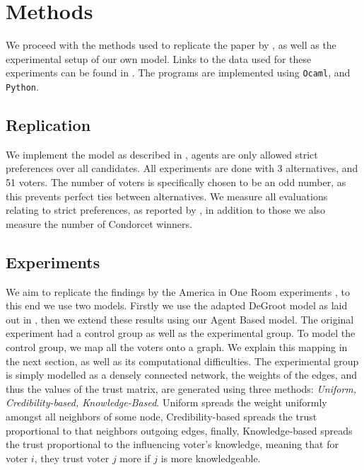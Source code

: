 \chapter{Methods}
\label{Methods}

We proceed with the methods used to replicate the paper by \citet{radDeliberationSinglePeakednessCoherent2021}, as well as the experimental setup of our own model. Links to the data used for these experiments can be found in . The programs are implemented using \texttt{Ocaml}, and \texttt{Python}.


\section{Replication}
We implement the model as described in , agents are only allowed strict preferences over all candidates. All experiments are done with 3 alternatives, and 51 voters. The number of voters is specifically chosen to be an odd number, as this prevents perfect ties between alternatives. We measure all evaluations relating to strict preferences, as reported by \citet{radDeliberationSinglePeakednessCoherent2021}, in addition to those we also measure the number of Condorcet winners.

\section{Experiments}
We aim to replicate the findings by the America in One Room experiments \cite{fishkinCanDeliberationHave2024}, to this end we use two models. Firstly we use the adapted DeGroot model as laid out in , then we extend these results using our Agent Based model. The original experiment had a control group as well as the experimental group. To model the control group, we map all the voters onto a graph. We explain this mapping in the next section, as well as its computational difficulties. The experimental group is simply modelled as a densely connected network, the weights of the edges, and thus the values of the trust matrix, are generated using three methods: \textit{Uniform, Credibility-based, Knowledge-Based}. Uniform spreads the weight uniformly amongst all neighbors of some node, Credibility-based spreads the trust proportional to that neighbors outgoing edges, finally, Knowledge-based spreads the trust proportional to the influencing voter's knowledge, meaning that for voter $i$, they trust voter $j$ more if $j$ is more knowledgeable.

